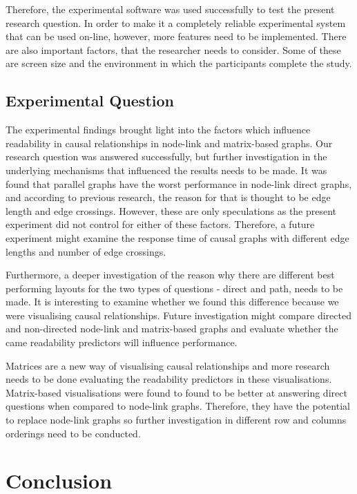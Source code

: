 \documentclass{l4proj}
\begin{document}
Therefore, the experimental software was used successfully to test the present research question. In order to make it a completely reliable experimental system that can be used on-line, however, more features need to be implemented. There are also important factors, that the researcher needs to consider. Some of these are screen size and the environment in which the participants complete the study.

\subsection{Experimental Question}

The experimental findings brought light into the factors which influence readability in causal relationships in node-link and matrix-based graphs. Our research question was answered successfully, but further investigation in the underlying mechanisms that influenced the results needs to be made. It was found that parallel graphs have the worst performance in node-link direct graphs, and according to previous research, the reason for that is thought to be edge length and edge crossings. However, these are only speculations as the present experiment did not control for either of these factors. Therefore, a future experiment might examine the response time of causal graphs with different edge lengths and number of edge crossings. 

Furthermore, a deeper investigation of the reason why there are different best performing layouts for the two types of questions - direct and path, needs to be made. It is interesting to examine whether we found this difference because we were visualising causal relationships. Future investigation might compare directed and non-directed node-link and matrix-based graphs and evaluate whether the came readability predictors will influence performance.

Matrices are a new way of visualising causal relationships and more research needs to be done evaluating the readability predictors in these visualisations. Matrix-based visualisations were found to found to be better at answering direct questions when compared to node-link graphs. Therefore, they have the potential to replace node-link graphs so further investigation in different row and columns orderings need to be conducted. 

\section{Conclusion}
\end{document}
